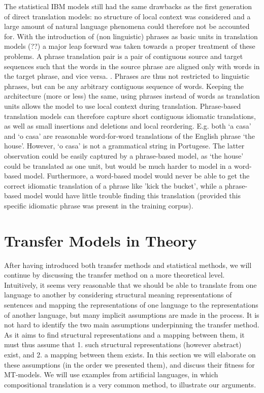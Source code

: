 \documentclass[a4paper, 11pt]{report}
\theoremstyle{definition}
\theoremstyle{plain}
\begin{document}
The statistical IBM models still had the same drawbacks as the first generation of direct translation models: no structure of local context was considered and a large amount of natural language phenomena could therefore not be accounted for. With the introduction of (non linguistic) phrases as basic units in translation models 
(\cite{wang1998grammar,och1999improved}??) a major leap forward was taken towards a proper treatment of these problems. A phrase translation pair is a pair of contiguous source and target sequences such that the words in the source phrase are aligned only with words in the target phrase, and vice versa. \citep{och2004alignment}. Phrases are thus not restricted to linguistic phrases, but can be any arbitrary contiguous sequence of words. Keeping the architecture (more or less) the same, using phrases instead of words as translation units allows the model to use local context during translation. Phrase-based translation models can therefore capture short contiguous idiomatic translations, as well as small insertions and deletions and local reordering. E.g. both `a casa' and `o casa' are reasonable word-for-word translations of the English phrase `the house'. However, `o casa' is not a grammatical string in Portugese. The latter observation could be easily captured by a phrase-based model, as `the house' could be translated as one unit, but would be much harder to model in a word-based model. Furthermore, a word-based model would never be able to get the correct idiomatic translation of a phrase like 'kick the bucket', while a phrase-based model would have little trouble finding this translation (provided this specific idiomatic phrase was present in the training corpus).


\section{Transfer Models in Theory}
\label{sec:theory}

After having introduced both transfer methods and statistical methods, we will continue by discussing the transfer method on a more theoretical level. Intuitively, it seems very reasonable that we should be able to translate from one language to another by considering structural meaning representations of sentences and mapping the representations of one language to the representations of another language, but many implicit assumptions are made in the process. It is not hard to identify the two main assumptions underpinning the transfer method. As it aims to find structural representations and a mapping between them, it must thus assume that 1. such structural representations (however abstract) exist, and 2. a mapping between them exists. In this section we will elaborate on these assumptions (in the order we presented them), and discuss their fitness for MT-models. We will use examples from artificial languages, in which compositional translation is a very common method, to illustrate our arguments.
\end{document}
